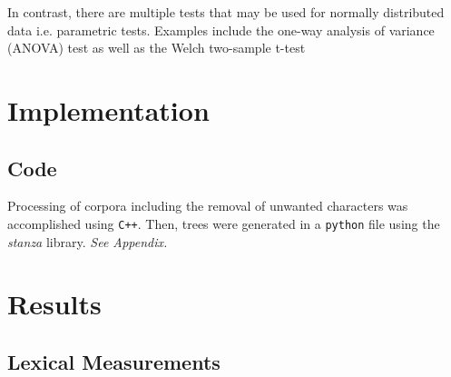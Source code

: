 \documentclass[a4paper,11pt]{article}
\begin{document}
In contrast, there are multiple tests that may be used for normally distributed data i.e. parametric tests. Examples include the one-way analysis of variance (ANOVA) test as well as the Welch two-sample t-test

\section{Implementation}
\subsection{Code}
Processing of corpora including the removal of unwanted characters was accomplished using \texttt{C++}. Then, trees were generated in a \texttt{python} file using the \textit{stanza} library. \textit{See Appendix.}

\section{Results}
\subsection{Lexical Measurements}
\end{document}
